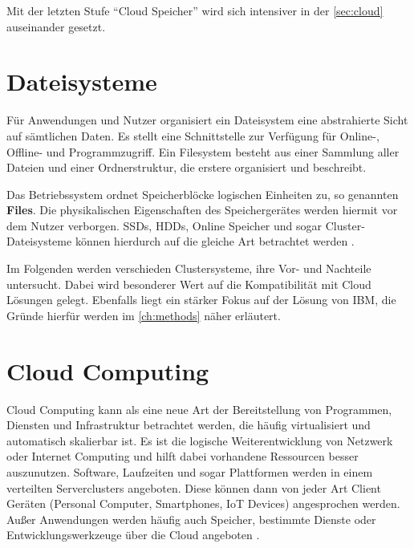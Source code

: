 Mit der letzten Stufe ``Cloud Speicher'' wird sich intensiver in der \autoref{sec:cloud} auseinander gesetzt. 



\newpage

\section{Dateisysteme} \label{sec:filesystems}

Für Anwendungen und Nutzer organisiert ein Dateisystem eine abstrahierte Sicht auf sämtlichen Daten. Es stellt eine Schnittstelle zur Verfügung für Online-, Offline- und Programmzugriff. Ein Filesystem besteht aus einer Sammlung aller Dateien und einer Ordnerstruktur, die erstere organisiert und beschreibt. 

Das Betriebssystem ordnet Speicherblöcke logischen Einheiten zu, so genannten \textbf{Files}. Die physikalischen Eigenschaften des Speichergerätes werden hiermit vor dem Nutzer verborgen. SSDs, HDDs, Online Speicher und sogar Cluster-Dateisysteme können hierdurch auf die gleiche Art betrachtet werden \parencite{silberschatz.2012}.

Im Folgenden werden verschieden Clustersysteme, ihre Vor- und Nachteile untersucht. Dabei wird besonderer Wert auf die Kompatibilität mit Cloud Lösungen gelegt. Ebenfalls liegt ein stärker Fokus auf der Lösung von IBM, die Gründe hierfür werden im \autoref{ch:methods} näher erläutert.



\section{Cloud Computing}\label{sec:cloud}

Cloud Computing kann als eine neue Art der Bereitstellung von Programmen, Diensten und Infrastruktur betrachtet werden, die häufig virtualisiert und automatisch skalierbar ist. Es ist die logische Weiterentwicklung von Netzwerk oder Internet Computing und hilft dabei vorhandene Ressourcen besser auszunutzen. 
Software, Laufzeiten und sogar Plattformen werden in einem verteilten Serverclusters angeboten. Diese können dann von jeder Art  Client Geräten (Personal Computer, Smartphones, \ac{IoT} Devices) angesprochen werden. Außer Anwendungen werden häufig  auch Speicher, bestimmte Dienste oder Entwicklungswerkzeuge über die Cloud angeboten \parencite[S. 3]{furth.2010}.

